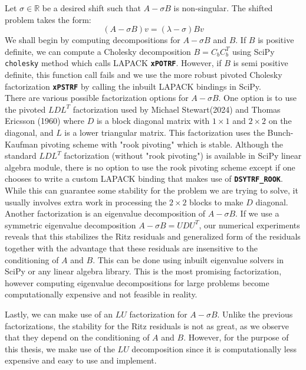 \documentclass[12pt,gsu,online,openany,singleside,hidelinks]{gsudiss}
\newcommand{\comm}[1]{\added[comment={#1}]{}}
\begin{document}
Let $\sigma \in \mathbb{R}$ be a desired shift such that $A - \sigma B$ is non-singular. The shifted problem takes the form:
\begin{equation}\label{3.3}
	(A - \sigma B)v = (\lambda - \sigma)Bv
\end{equation}
\comm{bold vectors}
We shall begin by computing decompositions for $A - \sigma B$ and $B$. If $B$ is positive  definite, we can compute a Cholesky decomposition $B = C_bC_b^T$ using SciPy \texttt{cholesky} method which calls LAPACK \textbf{\texttt{xPOTRF}}. However, if $B$ is semi positive definite, this function call fails and we use the more robust pivoted Cholesky factorization \textbf{\texttt{xPSTRF}} by calling the inbuilt LAPACK bindings in SciPy.\\
There are various possible factorization options for $A-\sigma B$. One option is to use the pivoted $LDL^{T}$ factorization used by Michael Stewart(2024) and Thomas Ericsson (1960) where $D$ is a block diagonal matrix with $1 \times 1$ and $2 \times 2$ on the diagonal, and $L$ is a lower triangular matrix. This factorization uses the Bunch-Kaufman pivoting scheme with "rook pivoting" which is stable. Although the standard $LDL^T$ factorization (without "rook pivoting") is available in SciPy linear algebra module, there is no option to use the rook pivoting scheme except if one chooses to write a custom LAPACK binding that makes use of \textbf{\texttt{DSYTRF\_ROOK}}. While this can guarantee some stability for the problem we are trying to solve, it usually involves extra work in processing the $2 \times 2$ blocks to make $D$ diagonal.\\
Another factorization is an eigenvalue decomposition of $A - \sigma B$. If we use a symmetric eigenvalue decomposition $A- \sigma B = UDU^T$, our numerical experiments reveals that this stabilizes the Ritz residuals and generalized form of the residuals together with the advantage that these residuals are insensitive to the conditioning of $A$ and $B$. This can be done using inbuilt eigenvalue solvers in SciPy or any linear algebra library. This is the most promising factorization, however computing eigenvalue decompositions for large problems become computationally expensive and not feasible in reality.

Lastly, we can make use of an $LU$ factorization for $A-\sigma B$. Unlike the previous factorizations, the stability for the Ritz residuals is not as great, as we observe that they depend on the conditioning of $A$ and $B$. However, for the purpose of this thesis, we make use of the $LU$ decomposition since it is computationally less expensive and easy to use and implement.
\end{document}
